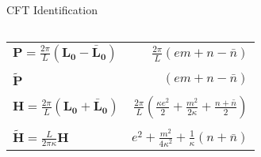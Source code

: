 \newcommand{\uL}{\mathbf{L_0}}
\newcommand{\bL}{\mathbf{\bar{L}_0}}
\begin{block}{CFT Identification}
\begin{columns}[T]
\begin{column}{.3\textwidth}

\begin{tabular}{lr}

$\mathbf{P} =\frac{2\pi}{L}(\uL-\bL)$ & 
$\frac{2\pi}{L}(em + n - \bar{n})$ \\
&
\\
$\widetilde{\mathbf{P}}$  &
$(em + n - \bar{n})$\\
& 
\\
$\mathbf{H} = \frac{2\pi}{L}(\uL+\bL)$ &
 $\frac{2\pi}{L}(\frac{\kappa e^2}{2} + \frac{m^2}{2 \kappa} + \frac{n + \bar{n}}{2})$ \\
&
 \\
$\widetilde{\mathbf{H}} = \frac{L}{2 \pi \kappa}\mathbf{H}$ &
 $e^2 + \frac{m^2}{4 \kappa^2} + \frac{1}{\kappa}(n + \bar{n})$       
\end{tabular}

\end{column}
\begin{column}{.5\textwidth}
\vskip-1cm
\begin{figure}[hbctp]
\begin{center}
\texttt{[image: \{interpolatedboson/a10/plots/EEIdentify.pdf]}}
\end{center}
\end{figure}

\end{column}
\end{columns}
\end{block}